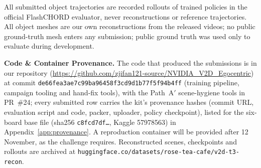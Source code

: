 All submitted object trajectories are recorded rollouts of trained policies in the official
FlashCHORD evaluator, never reconstructions or reference trajectories. All object meshes are our
own reconstructions from the released videos; no public ground-truth mesh enters any submission;
public ground truth was used only to evaluate during development.

\textbf{Code \& Container Provenance.} The code that produced the submissions is in our repository (\url{https://github.com/zjifan121-source/NVIDIA_V2D_Egocentric}) at commit \texttt{de66fea3ae7c99ba96458f3cd9d1b77f5f94b4ff} (training pipeline, campaign tooling and hand-fix tools), with the Path~A$'$ scene-hygiene tools in PR~\#24; every submitted row carries the kit's provenance hashes (commit URL, evaluation script and code, packer, uploader, policy checkpoint), listed for the six-board base file (sha256 \texttt{c8fcd7df\ldots}, Kaggle 57978563) in Appendix~\ref{app:provenance}. A reproduction container will be provided after 12 November, as the challenge requires. Reconstructed scenes, checkpoints and rollouts are archived at \texttt{huggingface.co/datasets/rose-tea-cafe/v2d-t3-recon}.
